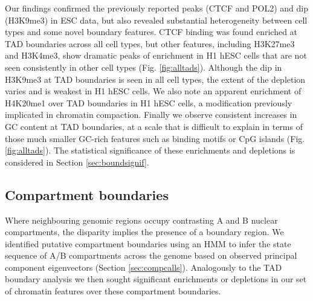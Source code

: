 \documentclass[a4paper,11pt,oneside]{book}
\begin{document}
Our findings confirmed the previously reported peaks (CTCF and POL2) and dip (H3K9me3) in ESC data, but also revealed substantial heterogeneity between cell types and some novel boundary features. CTCF binding was found enriched at TAD boundaries across all cell types, but other features, including H3K27me3 and H3K4me3, show dramatic peaks of enrichment in H1 hESC cells that are not seen consistently in other cell types (Fig. \ref{fig:alltads}). Although the dip in H3K9me3 at TAD boundaries is seen in all cell types, the extent of the depletion varies and is weakest in H1 hESC cells. We also note an apparent enrichment of H4K20me1 over TAD boundaries in H1 hESC cells, a modification previously implicated in chromatin compaction.\cite{Evertts2013} Finally we observe consistent increases in GC content at TAD boundaries, at a scale that is difficult to explain in terms of those much smaller GC-rich features such as binding motifs or CpG islands (Fig. \ref{fig:alltads}). The statistical significance of these enrichments and depletions is considered in Section \ref{sec:boundsignif}.

\subsection{Compartment boundaries}

Where neighbouring genomic regions occupy contrasting A and B nuclear
compartments, the disparity implies the presence of a boundary
region. We identified putative compartment boundaries using an
HMM to infer the state sequence of A/B compartments across the genome
based on observed principal component eigenvectors (Section \ref{sec:compcalls}). Analogously to the
TAD boundary analysis we then sought significant enrichments or
depletions in our set of chromatin features over these compartment boundaries.  
\end{document}
